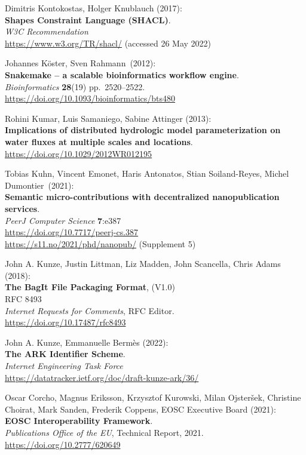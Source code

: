 \begin{thebibliography}{9}
Dimitris Kontokostas, Holger Knublauch (2017):\\
\textbf{Shapes {Constraint Language} ({SHACL})}.\\
\emph{W3C Recommendation}\\
\url{https://www.w3.org/TR/shacl/} (accessed 26 May 2022)

Johannes Köster, Sven Rahmann~(2012):\\
\textbf{Snakemake -- a scalable bioinformatics workflow engine}.\\
\emph{Bioinformatics} \textbf{28}(19) pp.~2520--2522.\\
\url{https://doi.org/10.1093/bioinformatics/bts480}

Rohini Kumar, Luis Samaniego, Sabine Attinger (2013):\\
\textbf{Implications of distributed hydrologic model parameterization on
water fluxes at multiple scales and locations}.\\
\url{https://doi.org/10.1029/2012WR012195}

Tobias Kuhn, Vincent Emonet, Haris Antonatos, Stian
Soiland-Reyes, Michel Dumontier~(2021):\\
\textbf{Semantic micro-contributions
with decentralized nanopublication services}.\\
\emph{PeerJ Computer Science} \textbf{7}:e387\\
\url{https://doi.org/10.7717/peerj-cs.387} \\
\url{https://s11.no/2021/phd/nanopub/} (Supplement 5)

John A. Kunze, Justin Littman, Liz Madden, John Scancella, Chris Adams (2018):\\
\textbf{The BagIt File Packaging Format}, (V1.0)\\
RFC 8493\\
\emph{Internet Requests for Comments}, RFC Editor.\\
\url{https://doi.org/10.17487/rfc8493}

John A. Kunze, Emmanuelle Bermès (2022): \\
\textbf{{The ARK Identifier Scheme}}.\\
\emph{Internet Engineering Task Force}\\
\url{https://datatracker.ietf.org/doc/draft-kunze-ark/36/}

Oscar Corcho, Magnus Eriksson, Krzysztof Kurowski, Milan Ojsteršek,
Christine Choirat, Mark Sanden, Frederik Coppens, EOSC Executive
Board (2021):\\
\textbf{EOSC Interoperability Framework}.\\
\emph{Publications Office of the EU}, Technical Report, 2021.\\
\url{https://doi.org/10.2777/620649}


\end{thebibliography}
